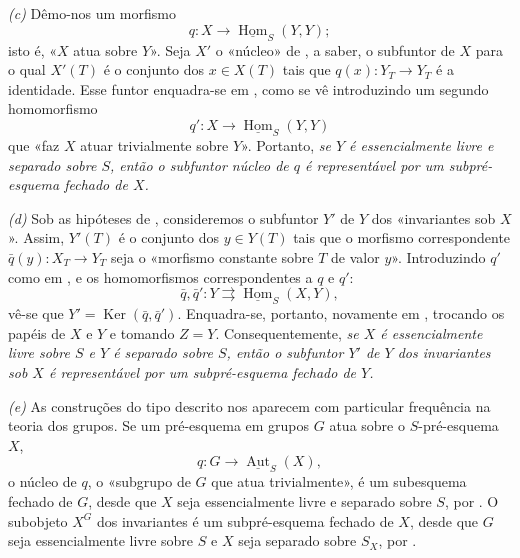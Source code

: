 
\smallskip
\noindent{}\textit{(c)}
Dêmo-nos um morfismo
\[
  q:X\longrightarrow\underline{\operatorname{Hom}}_S(Y,Y);
\]
isto é, «\(X\) atua sobre \(Y\)». Seja \(X'\) o «núcleo» de
, a
saber, o subfuntor de \(X\) para o qual \(X'(T)\) é o conjunto dos
\(x\in X(T)\) tais que \(q(x):Y_T\to Y_T\) é a identidade. Esse funtor
enquadra-se em , como se
vê introduzindo um segundo homomorfismo
\[
  q':X\longrightarrow\underline{\operatorname{Hom}}_S(Y,Y)
\]
que «faz \(X\) atuar trivialmente sobre \(Y\)». Portanto, \textit{se
\(Y\) é essencialmente livre e separado sobre \(S\), então o subfuntor
núcleo de \(q\) é representável por um subpré-esquema fechado de \(X\).}

\smallskip
\noindent{}\textit{(d)}
Sob as hipóteses de ,
consideremos o subfuntor \(Y'\) de \(Y\) dos «invariantes sob \(X\)».
Assim, \(Y'(T)\) é o conjunto dos \(y\in Y(T)\) tais que o morfismo
correspondente \(\bar q(y):X_T\to Y_T\) seja o «morfismo constante sobre
\(T\) de valor \(y\)». Introduzindo \(q'\) como em
, e os homomorfismos
correspondentes a \(q\) e \(q'\):
\[
  \bar q,\bar q':Y\rightrightarrows
  \underline{\operatorname{Hom}}_S(X,Y),
\]
vê-se que \(Y'=\operatorname{Ker}(\bar q,\bar q')\). Enquadra-se, portanto,
novamente em ,
trocando os papéis de \(X\) e \(Y\) e tomando \(Z=Y\). Consequentemente,
\textit{se \(X\) é essencialmente livre sobre \(S\) e \(Y\)
é separado sobre \(S\), então o subfuntor \(Y'\) de \(Y\) dos
invariantes sob \(X\) é representável por um subpré-esquema fechado de
\(Y\).}

\smallskip
\noindent{}\textit{(e)}
As construções do tipo descrito nos
 aparecem com
particular frequência na teoria dos grupos. Se um pré-esquema em
grupos \(G\) atua sobre o \(S\)-pré-esquema \(X\),
\[
  q:G\longrightarrow\underline{\operatorname{Aut}}_S(X),
\]
o núcleo de \(q\), o «subgrupo de \(G\) que atua trivialmente», é um
subesquema fechado de \(G\), desde que \(X\) seja essencialmente livre
e separado sobre \(S\), por
. O subobjeto \(X^G\) dos
invariantes é um subpré-esquema fechado de \(X\), desde que \(G\) seja
essencialmente livre sobre \(S\) e \(X\) seja separado sobre
\(S_X\), por
.


